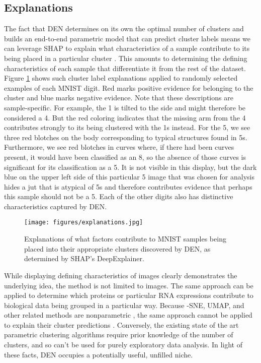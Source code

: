\documentclass{article}
\begin{document}
\subsection{Explanations}

The fact that DEN determines on its own the optimal number of clusters and builds an end-to-end parametric model that can predict cluster labels means we can leverage SHAP to explain what characteristics of a sample contribute to its being placed in a particular cluster \cite{NIPS2017_7062}. This amounts to determining the defining characteristics of each sample that differentiate it from the rest of the dataset. Figure \ref{fig:explanations} shows such cluster label explanations applied to randomly selected examples of each MNIST digit. Red marks positive evidence for belonging to the cluster and blue marks negative evidence. Note that these descriptions are sample-specific. For example, the 1 is tilted to the side and might therefore be considered a 4. But the red coloring indicates that the missing arm from the 4 contributes strongly to its being clustered with the 1s instead. For the 5, we see three red blotches on the body corresponding to typical structures found in 5s. Furthermore, we see red blotches in curves where, if there had been curves present, it would have been classified as an 8, so the absence of those curves is significant for its classification as a 5. It is not visible in this display, but the dark blue on the upper left side of this particular 5 image that was chosen for analysis hides a jut that is atypical of 5s and therefore contributes evidence that perhaps this sample should not be a 5. Each of the other digits also has distinctive characteristics captured by DEN.

\begin{figure}[htp]
    \centering
    \texttt{[image: figures/explanations.jpg]}
    \caption{Explanations of what factors contribute to MNIST samples being placed into their appropriate clusters discovered by DEN, as determined by SHAP's DeepExplainer.}
    \label{fig:explanations}
\end{figure}

While displaying defining characteristics of images clearly demonstrates the underlying idea, the method is not limited to images. The same approach can be applied to determine which proteins or particular RNA expressions contribute to biological data being grouped in a particular way. Because -SNE, UMAP, and other related methods are nonparametric \cite{maaten2008visualizing, 2018arXivUMAP}, the same approach cannot be applied to explain their cluster predictions \cite{NIPS2017_7062}. Conversely, the existing state of the art parametric clustering algorithms require prior knowledge of the number of clusters, and so can't be used for purely exploratory data analysis. In light of these facts, DEN occupies a potentially useful, unfilled niche.
\end{document}
